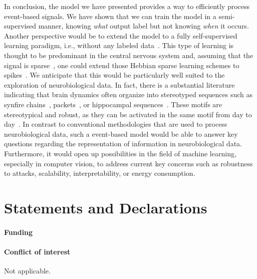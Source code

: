 \documentclass[default]{sn-jnl}%
\theoremstyle{thmstyleone}%
\theoremstyle{thmstyletwo}%
\theoremstyle{thmstylethree}%
\begin{document}
In conclusion, the model we have presented provides a way to efficiently process event-based signals. We have shown that we can train the model in a semi-supervised manner, knowing \emph{what} output label but not knowing \emph{when} it occurs. Another perspective would be to extend the model to a fully self-supervised learning paradigm, i.e., without any labeled data~\citep{barlow_unsupervised_1989}. This type of learning is thought to be predominant in the central nervous system and, assuming that the signal is sparse~\citep{olshausen_emergence_1996}, one could extend those Hebbian sparse learning schemes to spikes~\citep{perrinet_emergence_2004, masquelier_competitive_2009}. We anticipate that this would be particularly well suited to the exploration of neurobiological data. In fact, there is a substantial literature indicating that brain dynamics often organize into stereotyped sequences such as synfire chains~\citep{ikegaya_synfire_2004}, packets~\citep{luczak_sequential_2007}, or hippocampal sequences~\citep{pastalkova_internally_2008, villette_internally_2015}. These motifs are stereotypical and robust, as they can be activated in the same motif from day to day~\citep{haimerl_internal_2019}. In contrast to conventional methodologies that are used to process neurobiological data, such a event-based model would be able to answer key questions regarding the representation of information in neurobiological data. Furthermore, it would open up possibilities in the field of machine learning, especially in computer vision, to address current key concerns such as robustness to attacks, scalability, interpretability, or energy consumption.
%
\backmatter
%
%
\Acknowledgments
%

\section*{Statements and Declarations}

\paragraph{Funding}

\Funding %

\paragraph{Conflict of interest}
Not applicable.
\end{document}
